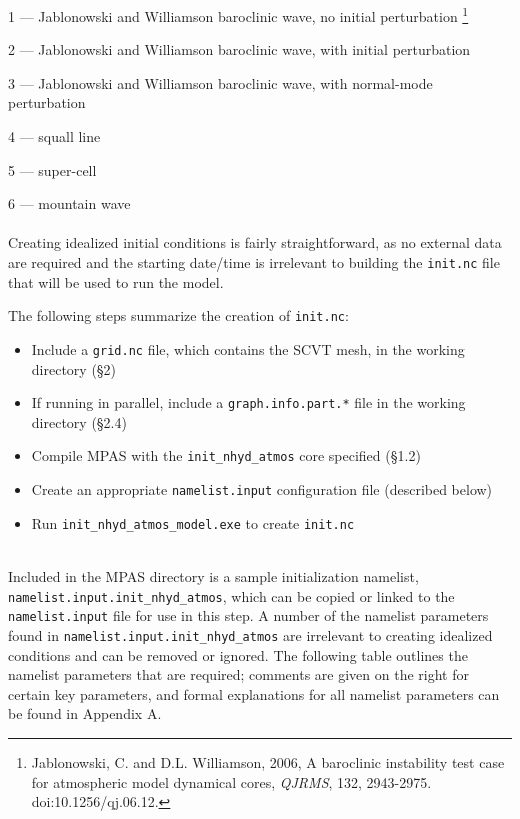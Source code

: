 1 --- Jablonowski and Williamson baroclinic wave, no initial perturbation
\footnote{Jablonowski, C. and D.L. Williamson, 2006, A baroclinic instability test case for atmospheric model dynamical cores, {\em QJRMS}, 132, 2943-2975. doi:10.1256/qj.06.12.}

2 --- Jablonowski and Williamson baroclinic wave, with initial perturbation

3 --- Jablonowski and Williamson baroclinic wave, with normal-mode perturbation

4 --- squall line

5 --- super-cell

6 --- mountain wave\\
\\
Creating idealized initial conditions is fairly straightforward, as no external data are required and the starting date/time is irrelevant to building the {\tt init.nc} file that will be used to run the model.

The following steps summarize the creation of {\tt init.nc}:

\begin{itemize}
\item Include a {\tt grid.nc} file, which contains the SCVT mesh, in the working directory (\S 2)
\item If running in parallel, include a {\tt graph.info.part.*} file in the working directory (\S 2.4)
\item Compile MPAS with the {\tt init\_nhyd\_atmos} core specified (\S 1.2)
\item Create an appropriate {\tt namelist.input} configuration file (described below)
\item Run {\tt init\_nhyd\_atmos\_model.exe} to create {\tt init.nc}
\end{itemize}~\\

Included in the MPAS directory is a sample initialization namelist, {\tt namelist.input.init\_nhyd\_atmos}, which can be copied or linked to the {\tt namelist.input} file for use in this step.  A number of the namelist parameters found in {\tt namelist.input.init\_nhyd\_atmos} are irrelevant to creating idealized conditions and can be removed or ignored.  The following table outlines the namelist parameters that are required; comments are given on the right for certain key parameters, and formal explanations for all namelist parameters can be found in Appendix A.


